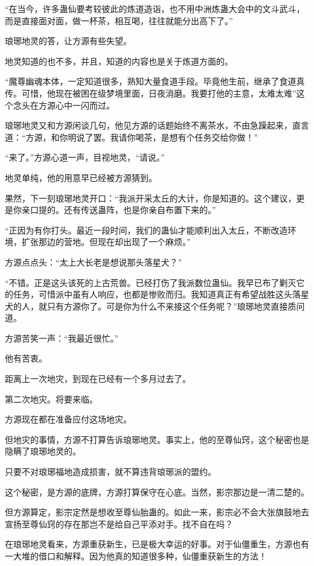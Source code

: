 \begin{this_body}
“在当今，许多蛊仙要考较彼此的炼道造诣，也不用中洲炼蛊大会中的文斗武斗，而是直接面对面，做一杯茶，相互喝，往往就能分出高下了。”

琅琊地灵的答，让方源有些失望。

地灵知道的也不多，并且，知道的内容也是关于炼道方面的。

“魔尊幽魂本体，一定知道很多，熟知大量食道手段。毕竟他生前，继承了食道真传。可惜，他现在被困在级梦境里面，日夜消磨。我要打他的主意，太难太难”这个念头在方源心中一闪而过。

琅琊地灵又和方源闲谈几句，他见方源的话题始终不离茶水，不由急躁起来，直言道：“方源，和你明说了罢。我请你喝茶，是想有个任务交给你做！”

“来了。”方源心道一声，目视地灵，“请说。”

地灵单纯，他的用意早已经被方源猜到。

果然，下一刻琅琊地灵开口：“我派开采太丘的大计，你是知道的。这个建议，更是你亲口提的。还有传送蛊阵，也是你亲自布置下来的。”

“正因为有你打头。最近一段时间，我们的蛊仙才能顺利出入太丘，不断改造环境，扩张那边的营地。但现在却出现了一个麻烦。”

方源点点头：“太上大长老是想说那头落星犬？”

“不错。正是这头该死的上古荒兽。已经打伤了我派数位蛊仙。我早已布了剿灭它的任务，可惜派中虽有人响应，也都是惨败而归。我知道真正有希望战胜这头落星犬的人，就只有方源你了。可是你为什么不来接这个任务呢？”琅琊地灵直接质问道。

方源苦笑一声：“我最近很忙。”

他有苦衷。

距离上一次地灾，到现在已经有一个多月过去了。

第二次地灾。将要来临。

方源现在都在准备应付这场地灾。

但地灾的事情，方源不打算告诉琅琊地灵。事实上，他的至尊仙窍，这个秘密也是隐瞒了琅琊地灵的。

只要不对琅琊福地造成损害，就不算违背琅琊派的盟约。

这个秘密，是方源的底牌，方源打算保守在心底。当然，影宗那边是一清二楚的。

但方源算定，影宗定然是想收至尊仙胎蛊的。如此一来，影宗必不会大张旗鼓地去宣扬至尊仙窍的存在那岂不是给自己平添对手。找不自在吗？

在琅琊地灵看来，方源重获新生，已是极大幸运的好事。对于仙僵重生，方源也有一大堆的借口和解释。因为他真的知道很多种，仙僵重获新生的方法！


\end{this_body}
